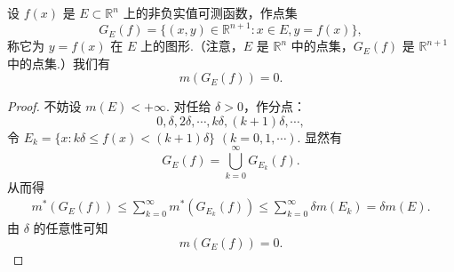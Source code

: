 \documentclass[../../main.tex]{subfiles}
\begin{document}
\begin{corollary}[可测函数图形的测度]\label{corollary:可测函数图形的测度}
设 \( f(x) \) 是 \( E \subset \mathbb{R}^n \) 上的非负实值可测函数，作点集
\[
G_E(f) = \{ (x, y) \in \mathbb{R}^{n + 1} : x \in E, y = f(x) \},
\]
称它为 \( y = f(x) \) 在 \( E \) 上的图形.（注意，\( E \) 是 \( \mathbb{R}^n \) 中的点集，\( G_E(f) \) 是 \( \mathbb{R}^{n + 1} \) 中的点集.）我们有
\[
m(G_E(f)) = 0.
\]
\end{corollary}
\begin{proof}
不妨设 \( m(E) < +\infty \). 对任给 \( \delta > 0 \)，作分点：
\[
0, \delta, 2\delta, \cdots, k\delta, (k + 1)\delta, \cdots,
\]
令 \( E_k = \{ x : k\delta \leqslant f(x) < (k + 1)\delta \} \) \( (k = 0, 1, \cdots) \). 显然有
\[
G_E(f) = \bigcup_{k = 0}^{\infty} G_{E_k}(f).
\]
从而得
\begin{align*}
m^*(G_E(f)) \leqslant \sum_{k = 0}^{\infty} m^*(G_{E_k}(f)) \leqslant \sum_{k = 0}^{\infty} \delta m(E_k) = \delta m(E).
\end{align*}
由 \( \delta \) 的任意性可知
\[
m(G_E(f)) = 0.
\]

\end{proof}
\end{document}
